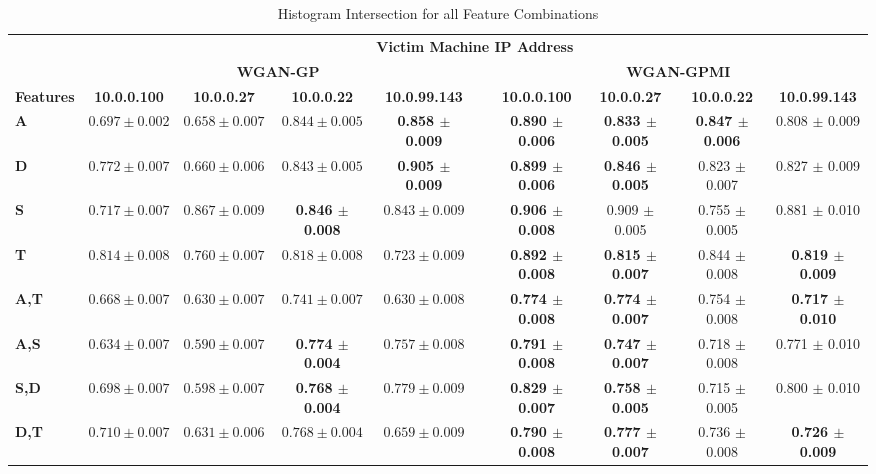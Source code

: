\begin{table}[!htbp]
	\caption{Histogram Intersection for all Feature Combinations}
	\label{tab:inter}
	\centering
	\small
	\begin{adjustbox}{angle=90}
	\begin{tabular}{l|c|c|c|c|c|c|c|c|c|}
		\multicolumn{1}{c|}{} & \multicolumn{9}{c|}{\textbf{Victim Machine IP Address}} \\
		\multicolumn{1}{c|}{} & \multicolumn{4}{c|}{\textbf{WGAN-GP}} &  & \multicolumn{4}{c|}{\textbf{WGAN-GPMI}} \\
		\multicolumn{1}{c|}{\textbf{Features}} & \textbf{10.0.0.100} & \textbf{10.0.0.27} & \textbf{10.0.0.22} & \textbf{10.0.99.143} & \textbf{} & \textbf{10.0.0.100} & \textbf{10.0.0.27} & \textbf{10.0.0.22} & \textbf{10.0.99.143} \\ \hline
		\textbf{A} & $0.697 \pm 0.002$ & $0.658 \pm 0.007$ & $0.844 \pm 0.005$ & \textbf{0.858 $\pm$ 0.009} & & \textbf{0.890 $\pm$ 0.006} & \textbf{0.833 $\pm$ 0.005} & \textbf{0.847 $\pm$ 0.006} & 0.808 $\pm$ 0.009 \\
		\textbf{D} & $0.772 \pm 0.007$ & $0.660 \pm 0.006$ & $0.843 \pm 0.005$ & \textbf{0.905 $\pm$ 0.009} & & \textbf{0.899 $\pm$ 0.006} & \textbf{0.846 $\pm$ 0.005} & 0.823 $\pm$ 0.007 & 0.827 $\pm$ 0.009 \\
		\textbf{S} & $0.717 \pm 0.007$ & $0.867 \pm 0.009$ & \textbf{0.846 $\pm$ 0.008} & $0.843 \pm 0.009$ & & \textbf{0.906 $\pm$ 0.008} & 0.909 $\pm$ 0.005 & 0.755 $\pm$ 0.005 & 0.881 $\pm$ 0.010 \\
		\textbf{T} & $0.814 \pm 0.008$ & $0.760 \pm 0.007$ & $0.818 \pm 0.008$ & $0.723 \pm 0.009$ & & \textbf{0.892 $\pm$ 0.008} & \textbf{0.815 $\pm$ 0.007} & 0.844 $\pm$ 0.008 & \textbf{0.819 $\pm$ 0.009} \\ \hline
		\textbf{A,T} & $0.668 \pm 0.007$ & $0.630 \pm 0.007$ & $0.741 \pm 0.007$ & $0.630 \pm 0.008$ & & \textbf{0.774 $\pm$ 0.008} & \textbf{0.774 $\pm$ 0.007} & 0.754 $\pm$ 0.008 & \textbf{0.717 $\pm$ 0.010} \\
		\textbf{A,S} & $0.634 \pm 0.007$ & $0.590 \pm 0.007$ & \textbf{0.774 $\pm$ 0.004} & $0.757 \pm 0.008$ & & \textbf{0.791 $\pm$ 0.008} & \textbf{0.747 $\pm$ 0.007} & 0.718 $\pm$ 0.008 & 0.771 $\pm$ 0.010 \\
		\textbf{S,D} & $0.698 \pm 0.007$ & $0.598 \pm 0.007$ & \textbf{0.768 $\pm$ 0.004} & $0.779 \pm 0.009$ & & \textbf{0.829 $\pm$ 0.007} & \textbf{0.758 $\pm$ 0.005} & 0.715 $\pm$ 0.005 & 0.800 $\pm$ 0.010 \\
		\textbf{D,T} & $0.710 \pm 0.007$ & $0.631 \pm 0.006$ & $0.768 \pm 0.004$ & $0.659 \pm 0.009$ & & \textbf{0.790 $\pm$ 0.008} & \textbf{0.777 $\pm$ 0.007} & 0.736 $\pm$ 0.008 & \textbf{0.726 $\pm$ 0.009} \\

\end{tabular}
\end{adjustbox}
\end{table}
